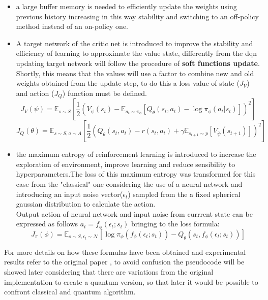 \begin{itemize}
	\item a large buffer memory is needed to efficiently update the weights using previous history increasing in this way stability and switching to an off-policy method instead of an on-policy one.
	\item A target network of the critic net is introduced to improve the stability and efficiency of learning to approximate the value state, differently from the \acrshort{dqn} updating target network will follow the procedure of \textbf{soft functions update}. Shortly, this means that the values will use a factor to combine new and old weights obtained from the update step, to do this a loss value of state ($J_{V}$) and action ($J_{Q}$) function must be defined.
	\begin{equation}\label{state of calue loss}
		J_{V}(\psi)= \mathbb{E}_{s \sim S}\left[ \frac{1}{2} (V_\psi(s_t) - \mathbb{E}_{a_t \sim \pi_\phi}[Q_\theta(s_t,a_t) - \log \pi_{\phi}(a_t|s_t)])^2 \right]
	\end{equation}
	\begin{equation}\label{state of action loss}
		J_{Q}(\theta)= \mathbb{E}_{s \sim S, a \sim A }\left[\frac{1}{2}(Q_\theta(s_t,a_t) - r(s_t,a_t) + \gamma \mathbb{E}_{s_{t+1} \sim p}[V_{\overline{\psi}}(s_{t+1})] )^2 \right]
	\end{equation}
	\item the maximum entropy of reinforcement learning is introduced to increase the exploration of environment, improve learning and reduce sensibility to hyperparameters.The loss of this maximum entropy was transformed for this case from the "classical" one considering the use of a neural network and introducing an input noise vector($\epsilon_t$) sampled from the a fixed spherical gaussian distribution to calculate the action.\\
	Output action of neural network and input noise from currrent state can be expressed as follows $a_t = f_\phi(\epsilon_t;s_t)$ bringing to the loss formula:
	\begin{equation}\label{policy loss}
		J_{\pi}(\phi)= \mathbb{E}_{s \sim S, \epsilon_t \sim \mathcal{N}}\left[ \log \pi_{\phi}(f_\phi(\epsilon_t;s_t)) - Q_{\theta}(s_t, f_\phi(\epsilon_t;s_t))\right]
	\end{equation}
\end{itemize}
For more details on how these formulas have been obtained and experimental results refer to the original paper \cite{DBLP:journals/corr/abs-1801-01290}, to avoid confusion the pseudocode will be showed later considering that there are variations from the original implementation to create a quantum version, so that later it would be possible to confront classical and quantum algorithm.
